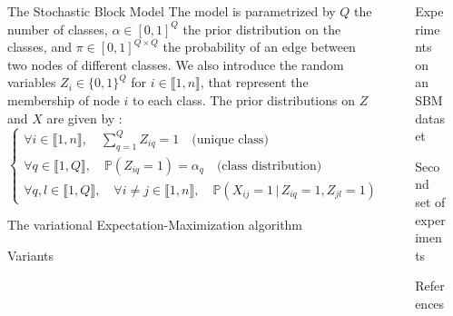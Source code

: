 \documentclass[final]{beamer}
\newlength{\sepwidth}
\newlength{\colwidth}
\newcommand{\separatorcolumn}{\begin{column}{\sepwidth}\end{column}}
\begin{document}
\begin{frame}[t]
\begin{columns}[t]
\begin{column}{\colwidth}
\begin{block}{The Stochastic Block Model}
        The model is parametrized by $Q$ the number of classes, $\alpha\in [0,1]^Q$ the prior distribution on the classes, and $\pi\in [0,1]^{Q\times Q}$ the probability of an edge between two nodes of different classes. We also introduce the random variables $Z_i\in \{0,1\}^Q$ for $i\in \llbracket 1,n \rrbracket$, that represent the membership of node $i$ to each class. The prior distributions on $Z$ and $X$ are given by :
        \begin{equation}
          \begin{cases}
            \forall i\in \llbracket 1,n \rrbracket, \quad \sum_{q=1}^Q Z_{iq} = 1 \quad\text{(unique class)}            \\
            \forall q\in \llbracket 1,Q \rrbracket,\quad \mathbb{P}(Z_{iq}=1)=\alpha_q \quad\text{(class distribution)} \\
            \forall q,l\in \llbracket 1,Q \rrbracket, \quad \forall i\neq j\in \llbracket 1,n \rrbracket, \quad \mathbb{P}(X_{ij}=1\,|\,Z_{iq}=1,Z_{jl}=1)=\pi_{ql} \quad\text{(edge probability)}
          \end{cases}
        \end{equation}
      \end{block}

      \begin{alertblock}{The variational Expectation-Maximization algorithm}
      \end{alertblock}

      \begin{block}{Variants}

      \end{block}

    \end{column}

    \separatorcolumn

    \begin{column}{\colwidth}

      \begin{block}{Experiments on an SBM dataset}
      \end{block}

      \begin{block}{Second set of experiments}
      \end{block}

      \begin{block}{References}
        \nocite{*}
        \footnotesize{}
      \end{block}

    \end{column}

    \separatorcolumn

  \end{columns}
\end{frame}
\end{document}
